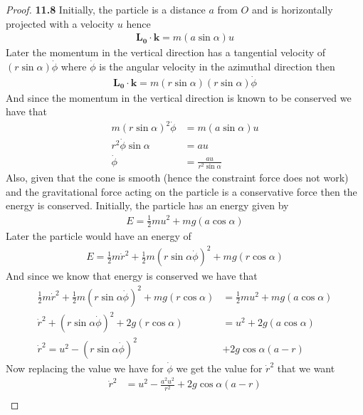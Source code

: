 \documentclass[11pt]{article}
\theoremstyle{definition}
\begin{document}
\begin{proof}{\textbf{11.8}}
    Initially, the particle is a distance $a$ from $O$ and is horizontally
    projected with a velocity $u$ hence
    \begin{align*}
        \bm{L_0 \cdot k} = m (a\sin\alpha) u
    \end{align*}
    Later the momentum in the vertical direction has a tangential velocity
    of $(r \sin\alpha )\dot{\phi}$ where $\dot{\phi}$ is the angular velocity
    in the azimuthal direction then
    \begin{align*}
        \bm{L_0 \cdot k} = m (r \sin\alpha)(r \sin\alpha)\dot{\phi}
    \end{align*}
    And since the momentum in the vertical direction is known to be conserved
    we have that
    \begin{align*}
        m (r \sin\alpha)^2\dot{\phi} &= m (a\sin\alpha) u\\
        r^2 \dot{\phi} \sin\alpha &= au \\
        \dot{\phi} &= \frac{au}{r^2 \sin \alpha}
    \end{align*}
    Also, given that the cone is smooth (hence the constraint force does not
    work) and the gravitational force acting on the particle is a conservative
    force then the energy is conserved. Initially, the particle has an energy
    given by 
    \begin{align*}
        E = \frac{1}{2}m u^2 + mg (a \cos \alpha) 
    \end{align*}
    Later the particle would have an energy of
    \begin{align*}
        E = \frac{1}{2}m \dot{r}^2 + \frac{1}{2}m (r \sin\alpha \dot{\phi})^2 + mg (r \cos \alpha) 
    \end{align*}
    And since we know that energy is conserved we have that
    \begin{align*}
        \frac{1}{2}m \dot{r}^2 + \frac{1}{2}m (r \sin\alpha \dot{\phi})^2 + mg (r \cos \alpha)
        &= \frac{1}{2}m u^2 + mg (a \cos \alpha)\\
        \dot{r}^2 + (r \sin\alpha \dot{\phi})^2 + 2g (r \cos \alpha)
        &= u^2 + 2g(a \cos \alpha)\\
        \dot{r}^2 = u^2 - (r \sin\alpha \dot{\phi})^2 &+ 2g\cos \alpha(a - r)
    \end{align*}
    Now replacing the value we have for $\dot{\phi}$ we get the value for
    $\dot{r}^2$ that we want
    \begin{align*}
        \dot{r}^2 &= u^2 - \frac{a^2u^2}{r^2} + 2g\cos \alpha(a - r)\\

\end{align*}
\end{proof}
\end{document}
